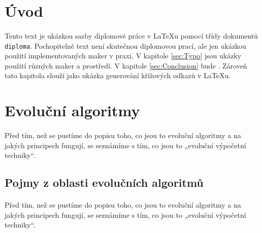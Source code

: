 \documentclass[bc,male,java,dept460]{diploma}		%
\begin{document}
\MakeTitlePages

\tableofcontents
\cleardoublepage	%

\listoftables
\cleardoublepage	%

\listoffigures
\cleardoublepage	%

\lstlistoflistings
\cleardoublepage	%

\section{Úvod}
\label{sec:Uvod}
\paragraph*{}
Tento text je ukázkou sazby diplomové práce v \LaTeX{}u pomocí třídy dokumentů \verb|diploma|.
Pochopitelně text není skutečnou diplomovou prací, ale jen ukázkou použití
implementovaných maker v praxi. V kapitole \ref{sec:Typo} jsou ukázky použití
různých maker a prostředí. V kapitole \ref{sec:Conclusion} bude . Zároveň tato kapitola slouží jako ukázka generování křížových odkazů v \LaTeX{}u.

\section{Evoluční algoritmy}
\paragraph*{}
Před tím, než se pustíme do popisu toho, co jsou to evoluční algoritmy a na jakých principech fungují, se seznámíme s tím, co jsou to „evoluční výpočetní techniky“.

\subsection{Pojmy z oblasti evolučních algoritmů}
\paragraph*{}
Před tím, než se pustíme do popisu toho, co jsou to evoluční algoritmy a na jakých principech fungují, se seznámíme s tím, co jsou to „evoluční výpočetní techniky“.
\end{document}
